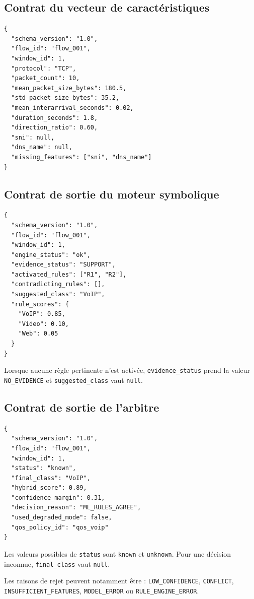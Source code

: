 \subsection{Contrat du vecteur de caractéristiques}

\begin{verbatim}
{
  "schema_version": "1.0",
  "flow_id": "flow_001",
  "window_id": 1,
  "protocol": "TCP",
  "packet_count": 10,
  "mean_packet_size_bytes": 180.5,
  "std_packet_size_bytes": 35.2,
  "mean_interarrival_seconds": 0.02,
  "duration_seconds": 1.8,
  "direction_ratio": 0.60,
  "sni": null,
  "dns_name": null,
  "missing_features": ["sni", "dns_name"]
}
\end{verbatim}

\subsection{Contrat de sortie du moteur symbolique}

\begin{verbatim}
{
  "schema_version": "1.0",
  "flow_id": "flow_001",
  "window_id": 1,
  "engine_status": "ok",
  "evidence_status": "SUPPORT",
  "activated_rules": ["R1", "R2"],
  "contradicting_rules": [],
  "suggested_class": "VoIP",
  "rule_scores": {
    "VoIP": 0.85,
    "Video": 0.10,
    "Web": 0.05
  }
}
\end{verbatim}

Lorsque aucune règle pertinente n'est activée,
\texttt{evidence\_status} prend la valeur
\texttt{NO\_EVIDENCE} et \texttt{suggested\_class}
vaut \texttt{null}.

\subsection{Contrat de sortie de l'arbitre}

\begin{verbatim}
{
  "schema_version": "1.0",
  "flow_id": "flow_001",
  "window_id": 1,
  "status": "known",
  "final_class": "VoIP",
  "hybrid_score": 0.89,
  "confidence_margin": 0.31,
  "decision_reason": "ML_RULES_AGREE",
  "used_degraded_mode": false,
  "qos_policy_id": "qos_voip"
}
\end{verbatim}

Les valeurs possibles de \texttt{status} sont
\texttt{known} et \texttt{unknown}. Pour une décision
inconnue, \texttt{final\_class} vaut \texttt{null}.

Les raisons de rejet peuvent notamment être :
\texttt{LOW\_CONFIDENCE}, \texttt{CONFLICT},
\texttt{INSUFFICIENT\_FEATURES}, \texttt{MODEL\_ERROR}
ou \texttt{RULE\_ENGINE\_ERROR}.

